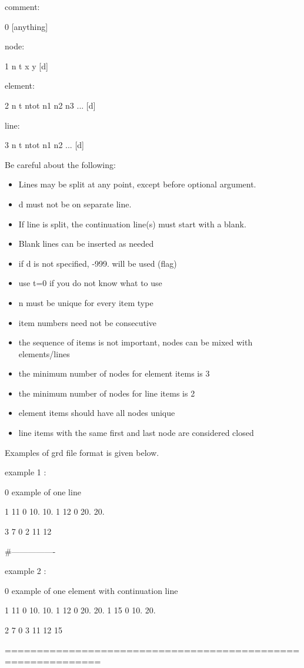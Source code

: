 \begin{code}
comment:

0 [anything]

node:

1	n	t	x	y	[d]

element:

2	n	t	ntot	n1 n2 n3 ... 	[d]

line:

3	n	t	ntot	n1 n2 ...	[d]


\end{code}
Be careful about the following:
\begin{itemize}
\item Lines may be split at any point, except before optional argument.
\item d must not be on separate line.
\item If line is split, the continuation line(s) must start with a blank.
\item Blank lines can be inserted as needed
\item if d is not specified, -999. will be used (flag)
\item use t=0 if you do not know what to use
\item n must be unique for every item type 
\item item numbers need not be consecutive
\item the sequence of items is not important, 
nodes can be mixed with elements/lines
\item the minimum number of nodes for element items is 3
\item the minimum number of nodes for line items is 2
\item element items should have all nodes unique
\item line items with the same first and last node are considered closed
\end{itemize}

Examples of grd file format is given below.
\begin{code}
example 1 :

0 example of one line

1 11 0 10. 10.
1 12 0 20. 20.

3 7 0 2 11 12

#----------------

example 2 :

0 example of one element with continuation line

1 11 0 10. 10.
1 12 0 20. 20.
1 15 0 10. 20.

2 7 0 3 
   11 12 15

=============================================================

\end{code}

